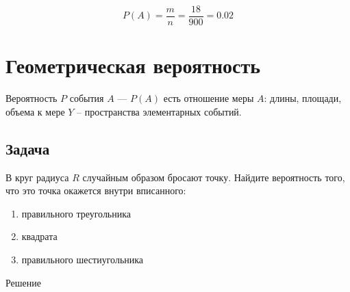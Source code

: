 \documentclass[a4paper,12pt]{extreport}
\begin{document}
$$P(A)=\frac{m}{n}=\frac{18}{900}=0.02$$

\section*{Геометрическая вероятность}
Вероятность $P$ события $A$ --- $P(A)$ есть отношение меры $A$: длины, площади, объема к мере $Y$ -- пространства элементарных событий.

\subsection{Задача}
В круг радиуса $R$ случайным образом бросают точку. Найдите вероятность того, что это точка окажется внутри вписанного:
\begin{enumerate}
	\item правильного треугольника
	\item квадрата
	\item правильного шестиугольника
\end{enumerate}
\begin{center}
Решение
\end{center}
\end{document}
